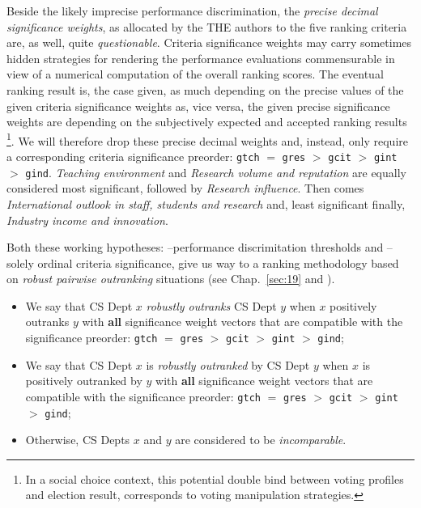 Beside the likely imprecise performance discrimination, the \emph{precise decimal significance weights}, as allocated by the THE authors to the five ranking criteria are, as well, quite \emph{questionable}. Criteria significance weights may carry sometimes hidden strategies for rendering the performance evaluations commensurable in view of a numerical computation of the overall ranking scores. The eventual ranking result is, the case given, as much depending on the precise values of the given criteria significance weights as, vice versa, the given precise significance weights are depending on the subjectively expected and accepted ranking results \footnote{In a social choice context, this potential double bind between voting profiles and election result, corresponds to voting manipulation strategies.}. We will therefore drop these precise decimal weights and, instead, only require a corresponding criteria significance preorder: \texttt{gtch} $=$ \texttt{gres} $>$ \texttt{gcit} $>$ \texttt{gint} $>$ \texttt{gind}. \emph{Teaching environment} and \emph{Research volume and reputation} are equally considered most significant, followed by \emph{Research influence}. Then comes \emph{International outlook in staff, students and research} and, least significant finally, \emph{Industry income and innovation}.

Both these working hypotheses: --performance discrimitation thresholds and --solely ordinal criteria significance, give us way to a ranking methodology based on \emph{robust pairwise outranking} situations (see Chap.~\ref{sec:19} and \citep{BIS-2004b}).
\begin{definition}\label{def:13.1}
\begin{itemize}[topsep=1pt]
\item We say that CS Dept $x$ \emph{robustly outranks} CS Dept $y$ when $x$ positively outranks $y$ with \textbf{all} significance weight vectors that are compatible with the significance preorder: \texttt{gtch} $=$ \texttt{gres} $>$ \texttt{gcit} $>$ \texttt{gint} $>$ \texttt{gind};
\item We say that CS Dept $x$ is \emph{robustly outranked} by CS Dept $y$ when $x$ is positively outranked by $y$ with \textbf{all} significance weight vectors that are compatible with the significance preorder: \texttt{gtch} $=$ \texttt{gres} $>$ \texttt{gcit} $>$ \texttt{gint} $>$ \texttt{gind};
\item Otherwise, CS Depts $x$ and $y$ are considered to be \emph{incomparable}.
\end{itemize}
\end{definition}

